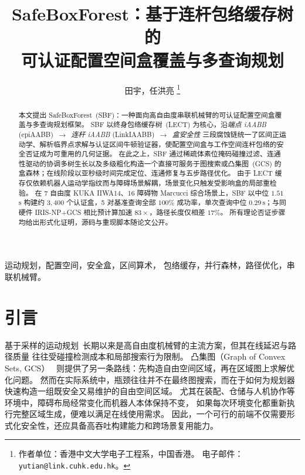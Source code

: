 \documentclass[journal]{IEEEtran}
\begin{document}
\title{SafeBoxForest：基于连杆包络缓存树的\\
可认证配置空间盒覆盖与多查询规划}

\author{田宇，任洪亮%
\thanks{作者单位：香港中文大学电子工程系，中国香港。
电子邮件：\texttt{yutian@link.cuhk.edu.hk}。}}

\maketitle

\begin{abstract}
本文提出 SafeBoxForest~(SBF)：一种面向高自由度串联机械臂的可认证配置空间盒覆盖与多查询规划框架。
SBF 以终身包络缓存树~(LECT) 为核心，沿\emph{端点 iAABB} (epiAABB)~$\to$~\emph{连杆 iAABB} (LinkIAABB)~$\to$~\emph{盒安全性} 三段腐蚀链统一了区间正运动学、解析临界点求解与认证区间牛顿验证器，使配置空间盒与工作空间连杆包络的安全否证成为可重用的几何证据。
在此之上，SBF 通过稀疏体素位掩码碰撞过滤、连通性驱动的协调多树生长以及多级粗化构造一个直接可服务于图搜索或凸集图~(GCS) 的盒森林；在线阶段以亚秒级时间完成定位、连通修复与五步路径优化。
由于 LECT 缓存仅依赖机器人运动学指纹而与障碍场景解耦，场景变化只触发受影响盒的局部重检验。
在 7 自由度 KUKA IIWA14、16 障碍物 Marcucci 综合场景上，SBF 以中位 $1.51$\,s 构建约 $3{,}400$ 个认证盒，5 对基准查询全部 $100\%$ 成功率，单次查询中位 $0.29$\,s；与同硬件 IRIS-NP+GCS 相比预计算加速 $83\times$，路径长度仅相差 $17\%$。
所有理论否证步骤均给出形式化证明，源码与重现脚本随论文公开。
\end{abstract}

\begin{IEEEkeywords}
运动规划，配置空间，安全盒，区间算术，
包络缓存，并行森林，路径优化，串联机械臂。
\end{IEEEkeywords}

\section{引言}
\label{sec:intro}

基于采样的运动规划~\cite{lavalle2006planning,lavalle1998rapidly,%
kavraki1996probabilistic}长期以来是高自由度机械臂的主流方案，但其在线延迟与路径质量
往往受碰撞检测成本和局部搜索行为限制。
凸集图（Graph of Convex Sets, GCS）~\cite{marcucci2024motion}
则提供了另一条路线：先构造自由空间区域，再在区域图上求解优化问题。
然而在实际系统中，瓶颈往往并不在最终图搜索，而在于如何为规划器快速构造一组既安全又易维护的自由空间区域。
尤其在装配、仓储与人机协作等环境中，障碍布局经常变化而机器人本体保持不变，
如果每次环境变化都重新执行完整区域生成，便难以满足在线使用需求。
因此，一个可行的前端不仅需要形式化安全性，还应具备高吞吐构建能力和跨场景复用能力。
\end{document}

